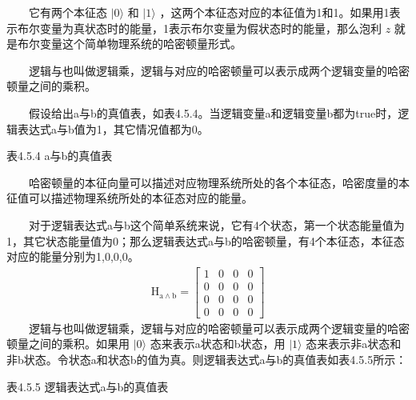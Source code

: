 \documentclass[a4paper,11pt,english]{sphinxmanual}
\begin{document}
\sphinxAtStartPar
  它有两个本征态 \(|0\rangle\) 和  \(|1\rangle\) ，这两个本征态对应的本征值为1和\sphinxhyphen{}1。如果用1表示布尔变量为真状态时的能量，\sphinxhyphen{}1表示布尔变量为假状态时的能量，那么泡利  \(z\) 就是布尔变量这个简单物理系统的哈密顿量形式。

\sphinxAtStartPar
{}

\sphinxAtStartPar
  逻辑与也叫做逻辑乘，逻辑与对应的哈密顿量可以表示成两个逻辑变量的哈密顿量之间的乘积。

\sphinxAtStartPar
  假设给出a与b的真值表，如表4.5.4。当逻辑变量a和逻辑变量b都为true时，逻辑表达式a与b值为1，其它情况值都为0。

\begin{center}表4.5.4 a与b的真值表
\end{center}

\sphinxAtStartPar
  哈密顿量的本征向量可以描述对应物理系统所处的各个本征态，哈密度量的本征值可以描述物理系统所处的本征态对应的能量。

\sphinxAtStartPar
  对于逻辑表达式a与b这个简单系统来说，它有4个状态，第一个状态能量值为1，其它状态能量值为0；那么逻辑表达式a与b的哈密顿量，有4个本征态，本征态对应的能量分别为1,0,0,0。
\begin{equation*}
\begin{split}\mathrm{H}_{\mathrm{a} \land \mathrm{b}}=\left[\begin{array}{llll} 1 & 0 & 0 & 0 \\ 0 & 0 & 0 & 0 \\ 0 & 0 & 0 & 0 \\ 0 & 0 & 0 & 0 \end{array}\right]\end{split}
\end{equation*}
\sphinxAtStartPar
  逻辑与也叫做逻辑乘，逻辑与对应的哈密顿量可以表示成两个逻辑变量的哈密顿量之间的乘积。如果用 \(|0\rangle\) 态来表示a状态和b状态，用 \(|1\rangle\) 态来表示非a状态和非b状态。令状态a和状态b的值为真。则逻辑表达式a与b的真值表如表4.5.5所示：

\begin{center}表4.5.5 逻辑表达式a与b的真值表
\end{center}
\end{document}
